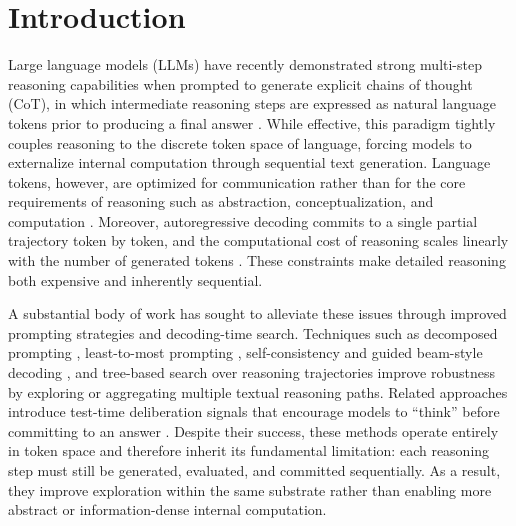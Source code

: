 \section{Introduction}
Large language models (LLMs) have recently demonstrated strong multi-step reasoning capabilities when prompted to generate explicit chains of thought (CoT), in which intermediate reasoning steps are expressed as natural language tokens prior to producing a final answer \cite{wei2022chain}. While effective, this paradigm tightly couples reasoning to the discrete token space of language, forcing models to externalize internal computation through sequential text generation. Language tokens, however, are optimized for communication rather than for the core requirements of reasoning such as abstraction, conceptualization, and computation \cite{fedorenko2024language,amalric2019distinct,monti2007functional,monti2009boundaries,monti2012thought,fedorenko2011functional}. Moreover, autoregressive decoding commits to a single partial trajectory token by token, and the computational cost of reasoning scales linearly with the number of generated tokens \cite{saparov2022language}. These constraints make detailed reasoning both expensive and inherently sequential.

A substantial body of work has sought to alleviate these issues through improved prompting strategies and decoding-time search. Techniques such as decomposed prompting \cite{khot2022decomposed}, least-to-most prompting \cite{zhou2022least}, self-consistency and guided beam-style decoding \cite{xie2023self}, and tree-based search over reasoning trajectories \cite{yao2023tree} improve robustness by exploring or aggregating multiple textual reasoning paths. Related approaches introduce test-time deliberation signals that encourage models to ``think'' before committing to an answer \cite{zelikman2024quiet}. Despite their success, these methods operate entirely in token space and therefore inherit its fundamental limitation: each reasoning step must still be generated, evaluated, and committed sequentially. As a result, they improve exploration within the same substrate rather than enabling more abstract or information-dense internal computation.

